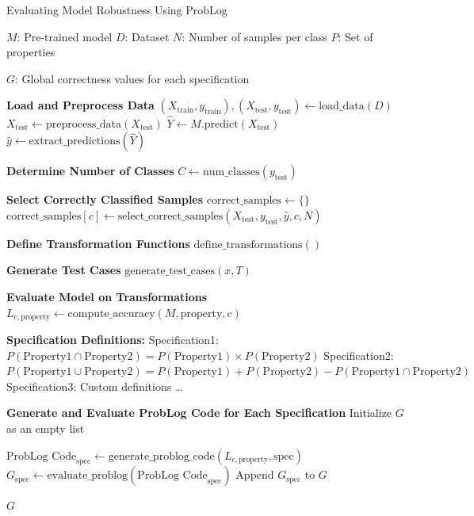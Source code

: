 \begin{algorithm}
  \caption{Evaluating Model Robustness Using ProbLog}
  \label{alg:model_robustness}
  \begin{algorithmic}[1]

  \REQUIRE $M$: Pre-trained model
  \REQUIRE $D$: Dataset
  \REQUIRE $N$: Number of samples per class
  \REQUIRE $P$: Set of properties

  \ENSURE $G$: Global correctness values for each specification

  \STATE \textbf{Load and Preprocess Data}
  \STATE $(X_{\text{train}}, y_{\text{train}}), (X_{\text{test}}, y_{\text{test}}) \leftarrow \text{load\_data}(D)$
  \STATE $X_{\text{test}} \leftarrow \text{preprocess\_data}(X_{\text{test}})$
  \STATE $\hat{Y} \leftarrow M.\text{predict}(X_{\text{test}})$
  \STATE $\hat{y} \leftarrow \text{extract\_predictions}(\hat{Y})$

  \STATE \textbf{Determine Number of Classes}
  \STATE $C \leftarrow \text{num\_classes}(y_{\text{test}})$ 

  \STATE \textbf{Select Correctly Classified Samples}
  \STATE $\text{correct\_samples} \leftarrow \{ \}$
      \STATE $\text{correct\_samples}[c] \leftarrow \text{select\_correct\_samples}(X_{\text{test}}, y_{\text{test}}, \hat{y}, c, N)$
  \ENDFOR

  \STATE \textbf{Define Transformation Functions}
  \STATE $\text{define\_transformations}()$

  \STATE \textbf{Generate Test Cases}
              \STATE $\text{generate\_test\_cases}(x, T)$
          \ENDFOR
      \ENDFOR
  \ENDFOR

  \STATE \textbf{Evaluate Model on Transformations}
          \STATE $L_{c, \text{property}} \leftarrow \text{compute\_accuracy}(M, \text{property}, c)$
      \ENDFOR
  \ENDFOR

  \STATE \textbf{Specification Definitions:}
  \STATE Specification1: $P(\text{Property1} \cap \text{Property2}) = P(\text{Property1}) \times P(\text{Property2})$ 
  \STATE Specification2: $P(\text{Property1} \cup \text{Property2}) = P(\text{Property1}) + P(\text{Property2}) - P(\text{Property1} \cap \text{Property2})$ 
  \STATE Specification3: Custom definitions
  \STATE \ldots

  \STATE \textbf{Generate and Evaluate ProbLog Code for Each Specification}
  \STATE Initialize $G$ as an empty list

      \STATE $\text{ProbLog Code}_{\text{spec}} \leftarrow \text{generate\_problog\_code}(L_{c, \text{property}}, \text{spec})$
      \STATE $G_{\text{spec}} \leftarrow \text{evaluate\_problog}(\text{ProbLog Code}_{\text{spec}})$
      \STATE Append $G_{\text{spec}}$ to $G$
  \ENDFOR

  \RETURN $G$
  \end{algorithmic}
\end{algorithm}

